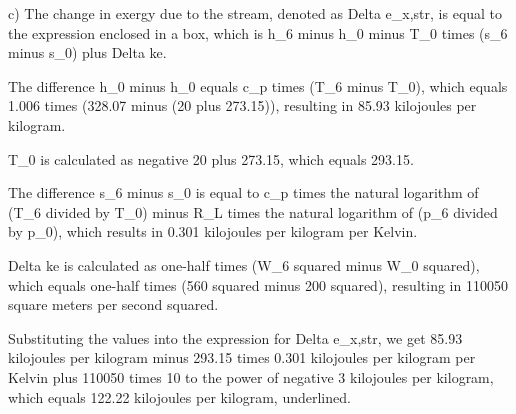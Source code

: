 c) The change in exergy due to the stream, denoted as Delta e_x,str, is equal to the expression enclosed in a box, which is h_6 minus h_0 minus T_0 times (s_6 minus s_0) plus Delta ke.

The difference h_0 minus h_0 equals c_p times (T_6 minus T_0), which equals 1.006 times (328.07 minus (20 plus 273.15)), resulting in 85.93 kilojoules per kilogram.

T_0 is calculated as negative 20 plus 273.15, which equals 293.15.

The difference s_6 minus s_0 is equal to c_p times the natural logarithm of (T_6 divided by T_0) minus R_L times the natural logarithm of (p_6 divided by p_0), which results in 0.301 kilojoules per kilogram per Kelvin.

Delta ke is calculated as one-half times (W_6 squared minus W_0 squared), which equals one-half times (560 squared minus 200 squared), resulting in 110050 square meters per second squared.

Substituting the values into the expression for Delta e_x,str, we get 85.93 kilojoules per kilogram minus 293.15 times 0.301 kilojoules per kilogram per Kelvin plus 110050 times 10 to the power of negative 3 kilojoules per kilogram, which equals 122.22 kilojoules per kilogram, underlined.